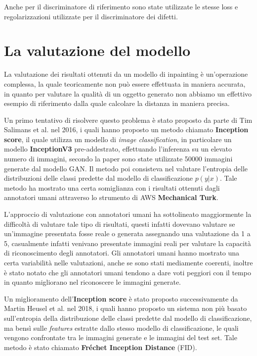 Anche per il discriminatore di riferimento sono state utilizzate le stesse loss e regolarizzazioni utilizzate per il discriminatore dei difetti.

\section{La valutazione del modello}
La valutazione dei risultati ottenuti da un modello di inpainting è un'operazione complessa, la quale teoricamente non può essere
effettuata in maniera accurata, in quanto per valutare la qualità di un oggetto generato non abbiamo un effettivo esempio di riferimento dalla
quale calcolare la distanza in maniera precisa.

Un primo tentativo di risolvere questo problema è stato proposto da parte di Tim Salimans et al. \cite{salimans2016improved}  nel 2016, 
i quali hanno proposto un metodo chiamato \textbf{Inception score}, il quale utilizza
un modello di \textit{image classification}, in particolare un modello \textbf{InceptionV3} pre-addestrato, effettuando l'inferenza su un elevato numero di immagini,
secondo la paper sono state utilizzate 50000 immagini generate dal modello GAN.
Il metodo poi consisteva nel valutare l'entropia delle distribuzioni delle classi predette dal modello di classificazione $p(y|x)$.
Tale metodo ha mostrato una certa somiglianza con i risultati ottenuti dagli annotatori umani attraverso lo strumento di AWS
\textbf{Mechanical Turk}. 

L'approccio di valutazione con annotatori umani ha sottolineato maggiormente la difficoltà di valutare tale tipo
di risultati, questi infatti dovevano valutare se un'immagine presentata fosse reale o generata assegnando una valutazione da 1 a 5,
casualmente infatti venivano presentate immagini reali per valutare la capacità di riconoscimento degli annotatori. 
Gli annotatori umani hanno mostrato una certa variabilità nelle valutazioni, anche se sono stati mediamente coerenti,
inoltre è stato notato che gli annotatori umani tendono a dare voti peggiori con il tempo in quanto migliorano
nel riconoscere le immagini generate.

Un miglioramento dell'\textbf{Inception score} è stato proposto successivamente da Martin Heusel et al. \cite{heusel2018gans} nel 2018,
i quali hanno proposto un sistema non più basato sull'entropia della distribuzione delle classi predette dal modello di classificazione,
ma bensì sulle \textit{features} estratte dallo stesso modello di classificazione, le quali vengono confrontate tra le immagini generate e le immagini del test set.
Tale metodo è stato chiamato \textbf{Fréchet Inception Distance} (FID).

